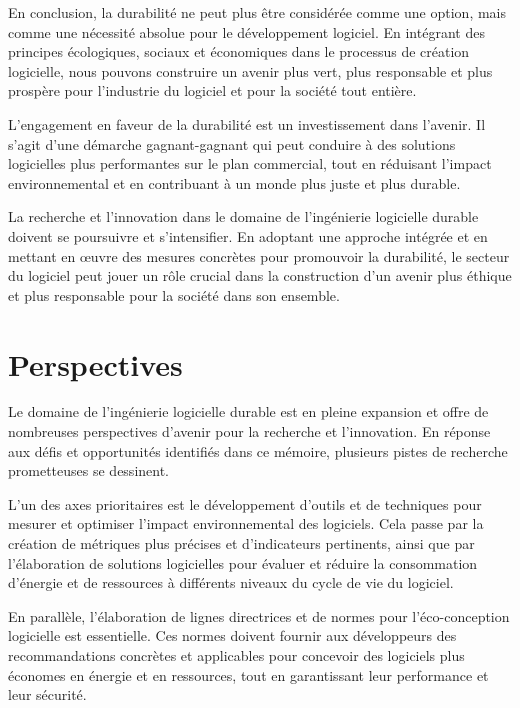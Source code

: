 En conclusion, la durabilité ne peut plus être considérée comme une option, mais comme une nécessité absolue pour le développement logiciel. En intégrant des principes écologiques, sociaux et économiques dans le processus de création logicielle, nous pouvons construire un avenir plus vert, plus responsable et plus prospère pour l'industrie du logiciel et pour la société tout entière.

L'engagement en faveur de la durabilité est un investissement dans l'avenir. Il s'agit d'une démarche gagnant-gagnant qui peut conduire à des solutions logicielles plus performantes sur le plan commercial, tout en réduisant l'impact environnemental et en contribuant à un monde plus juste et plus durable.

La recherche et l'innovation dans le domaine de l'ingénierie logicielle durable doivent se poursuivre et s'intensifier. En adoptant une approche intégrée et en mettant en œuvre des mesures concrètes pour promouvoir la durabilité, le secteur du logiciel peut jouer un rôle crucial dans la construction d'un avenir plus éthique et plus responsable pour la société dans son ensemble.


\section{Perspectives}
\label{sec:perspectives}
Le domaine de l'ingénierie logicielle durable est en pleine expansion et offre de nombreuses perspectives d'avenir pour la recherche et l'innovation. En réponse aux défis et opportunités identifiés dans ce mémoire, plusieurs pistes de recherche prometteuses se dessinent.

L'un des axes prioritaires est le développement d'outils et de techniques pour mesurer et optimiser l'impact environnemental des logiciels. Cela passe par la création de métriques plus précises et d'indicateurs pertinents, ainsi que par l'élaboration de solutions logicielles pour évaluer et réduire la consommation d'énergie et de ressources à différents niveaux du cycle de vie du logiciel.

En parallèle, l'élaboration de lignes directrices et de normes pour l'éco-conception logicielle est essentielle. Ces normes doivent fournir aux développeurs des recommandations concrètes et applicables pour concevoir des logiciels plus économes en énergie et en ressources, tout en garantissant leur performance et leur sécurité.

